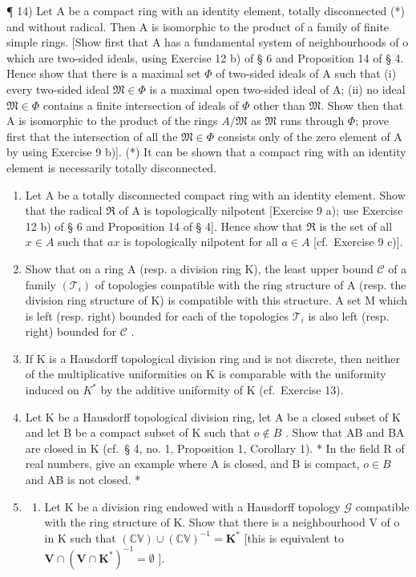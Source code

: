 ¶ 14) Let A be a compact ring with an identity element, totally disconnected (*) and without radical. Then A is isomorphic to the product of a family of finite simple rings. {[}Show first that A has a fundamental system of neighbourhoods of o which are two-sided ideals, using Exercise 12 b) of § 6 and Proposition 14 of § 4. Hence show that there is a maximal set \(\Phi\) of two-sided ideals of A such that (i) every two-sided ideal \(\mathfrak{M} \in \Phi\) is a maximal open two-sided ideal of A; (ii) no ideal \(\mathfrak{M} \in \Phi\) contains a finite intersection of ideals of \(\Phi\) other than \(\mathfrak{M}\). Show then that A is isomorphic to the product of the rings \(A/\mathfrak{M}\) as \(\mathfrak{M}\) runs through \(\Phi\); prove first that the intersection of all the \(\mathfrak{M} \in \Phi\) consists only of the zero element of A by using Exercise 9 b){]}.
(*) It can be shown that a compact ring with an identity element is necessarily totally disconnected.

\begin{enumerate}
\def\labelenumi{\arabic{enumi})}
\setcounter{enumi}{14}
\item
  Let A be a totally disconnected compact ring with an identity element. Show that the radical \(\Re\) of A is topologically nilpotent {[}Exercise 9 a); use Exercise 12 b) of § 6 and Proposition 14 of § 4{]}. Hence show that \(\Re\) is the set of all \(x \in A\) such that \(ax\) is topologically nilpotent for all \(a \in A\) {[}cf.~Exercise 9 c){]}.
\item
  Show that on a ring A (resp. a division ring K), the least upper bound \(\mathcal{C}\) of a family \((\mathcal{T}_i)\) of topologies compatible with the ring structure of A (resp. the division ring structure of K) is compatible with this structure. A set M which is left (resp. right) bounded for each of the topologies \(\mathcal{T}_i\) is also left (resp. right) bounded for \(\mathcal{C}\) .
\item
  If K is a Hausdorff topological division ring and is not discrete, then neither of the multiplicative uniformities on K is comparable with the uniformity induced on \(K^{*}\) by the additive uniformity of K (cf.~Exercise 13).
\item
  Let K be a Hausdorff topological division ring, let A be a closed subset of K and let B be a compact subset of K such that \(o \notin B\) . Show that AB and BA are closed in K (cf.~§ 4, no. 1, Proposition 1, Corollary 1). * In the field R of real numbers, give an example where A is closed, and B is compact, \(o \in B\) and AB is not closed. *
\item
  \begin{enumerate}
  \def\labelenumii{\alph{enumii})}
  \tightlist
  \item
    Let K be a division ring endowed with a Hausdorff topology \(\mathcal{G}\) compatible with the ring structure of K. Show that there is a neighbourhood V of o in K such that \((\mathbb{CV}) \cup (\mathbb{CV})^{-1} = \mathbf{K}^*\) {[}this is equivalent to \(\mathbf{V} \cap (\mathbf{V} \cap \mathbf{K}^*)^{-1} = \emptyset\) {]}.
  \end{enumerate}
\end{enumerate}

